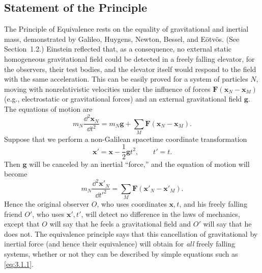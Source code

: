 
\subsection{Statement of the Principle}\label{sec:3.1}

The Principle of Equivalence rests on the equality of gravitational and
inertial mass, demonstrated by Galileo, Huygens, Newton, Bessel, and
E\"otv\"os. (See Section~1.2.) Einstein reflected that, as a consequence, no
external static homogeneous gravitational field could be detected in a
freely falling elevator, for the observers, their test bodies, and the
elevator itself would respond to the field with the same acceleration. This
can be easily proved for a system of particles $N$, moving with
nonrelativistic velocities under the influence of forces
$\mathbf F(\mathbf x_N-\mathbf x_M)$ (e.g., electrostatic or gravitational
forces) and an external gravitational field $\mathbf g$. The equations of
motion are
\begin{equation}
  m_N\frac{\dd^2\mathbf x_N}{\dd t^2}
  =m_N\mathbf g+\sum_M\mathbf F(\mathbf x_N-\mathbf x_M).
  \tag{3.1.1}\label{eq:3.1.1}
\end{equation}
Suppose that we perform a non-Galilean spacetime coordinate transformation
\begin{equation}
  \mathbf x'=\mathbf x-\frac12\mathbf g t^2,
  \qquad
  t'=t.
  \tag{3.1.2}\label{eq:3.1.2}
\end{equation}
Then $\mathbf g$ will be canceled by an inertial ``force,'' and the equation
of motion will become
\begin{equation}
  m_N\frac{\dd^2\mathbf x'_N}{\dd t'^2}
  =\sum_M\mathbf F(\mathbf x'_N-\mathbf x'_M).
  \tag{3.1.3}\label{eq:3.1.3}
\end{equation}
Hence the original observer $O$, who uses coordinates $\mathbf x,t$, and his
freely falling friend $O'$, who uses $\mathbf x',t'$, will detect no
difference in the laws of mechanics, except that $O$ will say that he feels a
gravitational field and $O'$ will say that he does not. The equivalence
principle says that this cancellation of gravitational by inertial force (and
hence their equivalence) will obtain for \emph{all} freely falling systems,
whether or not they can be described by simple equations such as
\eqref{eq:3.1.1}.

